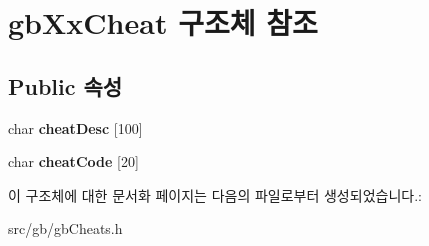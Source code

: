 \hypertarget{structgb_xx_cheat}{}\section{gb\+Xx\+Cheat 구조체 참조}
\label{structgb_xx_cheat}
\subsection*{Public 속성}
\begin{DoxyCompactItemize}
\item 
\mbox{\label{structgb_xx_cheat_a44a4fb7ecbad404cba31ef24bbf9fa72}} 
char {\bfseries cheat\+Desc} \mbox{[}100\mbox{]}
\item 
\mbox{\label{structgb_xx_cheat_a913e5f0e9db40d08fb4c6133cd313e1f}} 
char {\bfseries cheat\+Code} \mbox{[}20\mbox{]}
\end{DoxyCompactItemize}


이 구조체에 대한 문서화 페이지는 다음의 파일로부터 생성되었습니다.\+:\begin{DoxyCompactItemize}
\item 
src/gb/gb\+Cheats.\+h\end{DoxyCompactItemize}
